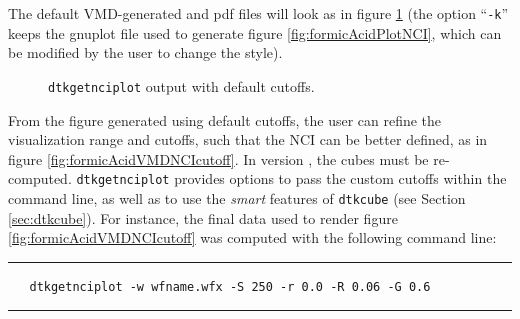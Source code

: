 The default VMD-generated and pdf files will look as in figure \ref{fig:dtkgetnciplot} (the
option ``\texttt{-k}'' keeps the gnuplot file used to generate figure \ref{fig:formicAcidPlotNCI},
which can be modified by the user to change the style).
%
\begin{figure}[hb!]
\centering
{}\quad
{}
\caption{\texttt{dtkgetnciplot} output with default cutoffs.}\label{fig:dtkgetnciplot}
\end{figure}
%

From the figure generated using default cutoffs, the user can refine the visualization range and
cutoffs, such that the NCI can be better defined, as in figure \ref{fig:formicAcidVMDNCIcutoff}.
In version \dtkversion, the cubes must be re-computed.
\texttt{dtkgetnciplot} provides options to pass the custom cutoffs within the command line, as well
as to use the \textit{smart} features of \texttt{dtkcube} (see Section \ref{sec:dtkcube}).
For instance, the final data used to render figure \ref{fig:formicAcidVMDNCIcutoff} was
computed with the following command line:

\rule{\textwidth}{1pt}
\begin{footnotesize}
\begin{verbatim}
   dtkgetnciplot -w wfname.wfx -S 250 -r 0.0 -R 0.06 -G 0.6
\end{verbatim}
\end{footnotesize}
\rule{\textwidth}{1pt}


